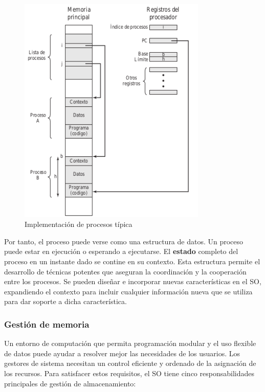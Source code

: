 \documentclass{article}
\begin{document}
				\begin{figure}
				\caption{Implementación de procesos típica}
				\label{figura18:implementaciondeprocesos}
				\centering
				\includegraphics[width=0.8\textwidth, scale=1]{figura18.png}
				\end{figure}					
							
							
				Por tanto, el proceso puede verse como una estructura de datos. Un proceso puede estar en ejecución o esperando a ejecutarse. El \textbf{estado} completo del proceso en un instante dado se contine en su contexto. Esta estructura permite el desarrollo de técnicas potentes que aseguran la coordinación y la cooperación entre los procesos. Se pueden diseñar e incorporar nuevas características en el SO, expandiendo el contexto para incluir cualquier información nueva que se utiliza para dar soporte a dicha característica.
				
			\subsubsection{Gestión de memoria}
				Un entorno de computación que permita programación modular y el uso flexible de datos puede ayudar a resolver mejor las necesidades de los usuarios. Los gestores de sistema necesitan un control eficiente y ordenado de la asignación de los recursos. Para satisfacer estos requisitos, el SO tiene cinco responsabilidades principales de gestión de almacenamiento:
				
\end{document}

